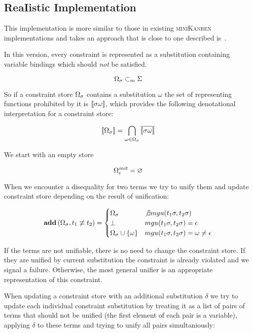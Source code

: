 \subsection{ReaIistic Implementation}

This implementation is more similar to those in existing \textsc{miniKanren} implementations and takes an approach that is close to one described is~\cite{CKanren}.

In this version, every constraint is represented as a substitution containing variable bindings which should \emph{not} be satisfied.

\[ \Omega_\sigma \subset_m \Sigma \]

So if a constraint store $\Omega_\sigma$ contains a substitution $\omega$ the set of representing functions prohibited by it is $\llbracket{\sigma \omega}\rrbracket$,
which provides the following denotational interpretation for a constraint store:

\[ \llbracket{\Omega_\sigma}\rrbracket = \bigcap_{\omega \in \Omega_\sigma} \overline{ \llbracket{\sigma \omega}\rrbracket } \]

We start with an empty store

\[ \Omega_\epsilon^{\mathit{init}} = \varnothing \]

When we encounter a disequality for two terms we try to unify them and update constraint store depending on the result of unification:

\[
\mathbf{add}\,(\Omega_\sigma, t_1 \not\equiv t_2) =
    \begin{cases}
       \Omega_\sigma                                & \not\exists mgu(t_1 \sigma, t_2 \sigma) \\
       \bot                                                 & mgu(t_1 \sigma, t_2 \sigma) = \epsilon \\
       \Omega_\sigma \cup \{\omega\}      & mgu(t_1 \sigma, t_2 \sigma) = \omega \neq \epsilon
    \end{cases}
\]

If the terms are not unifiable, there is no need to change the constraint store. If they are unified by current substitution the constraint is already violated and we signal a failure.
Otherwise, the most general unifier is an appropriate representation of this constraint.

When updating a constraint store with an additional substitution $\delta$ we try to update each individual constraint substitution by treating it
as a list of pairs of terms that should not be unified (the first element of each pair is a variable), applying $\delta$ to these terms and trying to
unify all pairs simultaniously:

